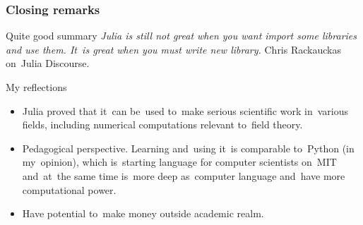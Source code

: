 \documentclass{beamer}  %
\begin{document}


  






\begin{frame}
  \frametitle{Closing remarks}

  \begin{block}{Quite good summary}
    \emph{Julia is still not great when you want import some libraries
      and use them. It~is great when you must write new library.}
    Chris Rackauckas on~Julia Discourse.
  \end{block}

  \begin{block}{My reflections}
    \begin{itemize}
    \item Julia proved that it~can be~used to~make serious scientific
      work in~various fields, including numerical computations
      relevant to~field theory.
    \item Pedagogical perspective. Learning and~using it~is comparable
      to~Python (in my~opinion), which is~starting language for
      computer scientists on~MIT and~at~the same time is~more deep
      as~computer language and~have more computational power.
    \item Have potential to~make money outside academic realm.
    \end{itemize}
  \end{block}

\end{frame}
\end{document}
